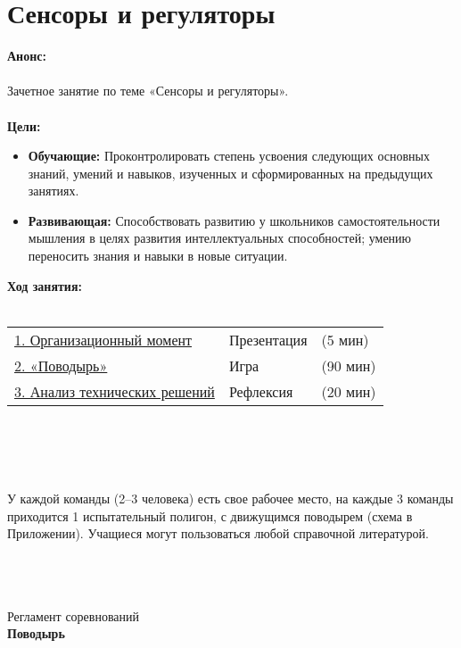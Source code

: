 \chapter{Сенсоры и регуляторы}
{\bfseries Анонс:}\\\\
Зачетное занятие по теме «Сенсоры и регуляторы».\\\\
{\bfseries Цели:}
\begin{itemize}
	\item{}{\bfseries Обучающие:} Проконтролировать степень усвоения следующих основных знаний, умений и навыков, изученных и сформированных на предыдущих занятиях.
	\item{}{\bfseries Развивающая:} Способствовать развитию  у школьников самостоятельности мышления в целях развития интеллектуальных способностей; умению переносить знания и навыки в новые ситуации.\\
\end{itemize}	
{\bfseries Ход занятия:}\\\\
\begin{tabular}[h!]{lll}
	{\hyperlink{lesson18x1}{1. Организационный момент}}&{Презентация}&{(5 мин)}\\
	{\hyperlink{lesson18x2}{2. «Поводырь»}}&{Игра}&{(90 мин)}\\
	{\hyperlink{lesson18x3}{3. Анализ технических решений}}&{Рефлексия}&{(20 мин)}\\
\end{tabular}\\\\

{\hypertarget{lesson18x1}{}}\\\\

У каждой команды (2--3 человека) есть свое рабочее место, на каждые 3 команды приходится 1 испытательный полигон, с движущимся поводырем (схема в Приложении). Учащиеся могут пользоваться любой справочной литературой.\\\\
\clearpage
{\hypertarget{lesson18x2}{}}\\\\

\begin{center}
	Регламент соревнований\\
	{\bfseries Поводырь}
\end{center}

